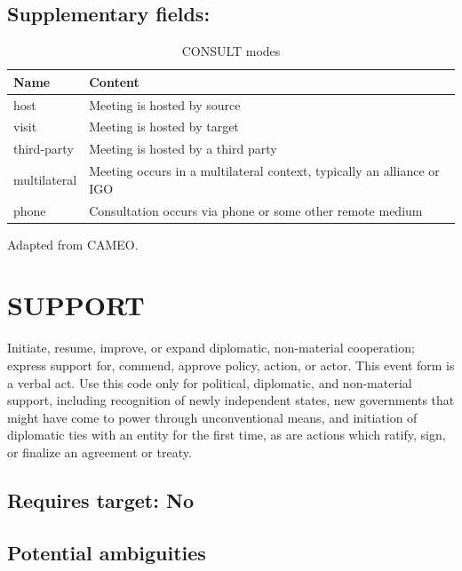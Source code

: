 \documentclass[11pt]{report}
\begin{document}
\subsection{Supplementary fields: }

\begin{table}[htp]
\caption{CONSULT modes}
\begin{center}
\begin{tabular}{|l|p{13cm}|}
\hline
Name & Content \\
\hline
host & Meeting is hosted by source\\
visit & Meeting is hosted by target \\
third-party & Meeting is hosted by a third party\\
multilateral & Meeting occurs in a multilateral context, typically an alliance or IGO\\
phone & Consultation occurs via phone or some other remote medium\\
\hline
\end{tabular}
\end{center}
\label{tab:consultmode}
Adapted from CAMEO.
\end{table}%

\newpage

\section{SUPPORT}

Initiate, resume, improve, or expand diplomatic, non-material cooperation; express support for, commend, approve policy, action, or actor. This event form is a verbal act. Use this code only for political, diplomatic, and non-material support, including recognition of newly independent states, new governments that might have come to power through unconventional means, and initiation of diplomatic ties with an entity for the first time, as are actions which ratify, sign, or finalize an agreement or treaty.
 
\subsection{Requires target: No}

\subsection{Potential ambiguities}
\end{document}
